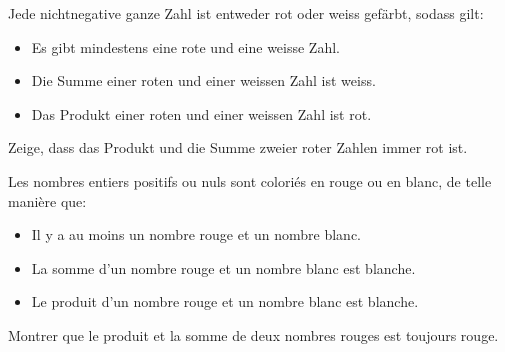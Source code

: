 {Jede nichtnegative ganze Zahl ist entweder rot oder weiss gefärbt, sodass gilt:
\begin{itemize}
\item Es gibt mindestens eine rote und eine weisse Zahl.
\item Die Summe einer roten und einer weissen Zahl ist weiss.
\item Das Produkt einer roten und einer weissen Zahl ist rot.
\end{itemize}
Zeige, dass das Produkt und die Summe zweier roter Zahlen immer rot ist.}
{Les nombres entiers positifs ou nuls sont coloriés en rouge ou en blanc, de telle manière que:
\begin{itemize}
\item Il y a au moins un nombre rouge et un nombre blanc.
\item La somme d'un nombre rouge et un nombre blanc est blanche.
\item Le produit d'un nombre rouge et un nombre blanc est blanche.
\end{itemize}
Montrer que le produit et la somme de deux nombres rouges est toujours rouge.}
{}